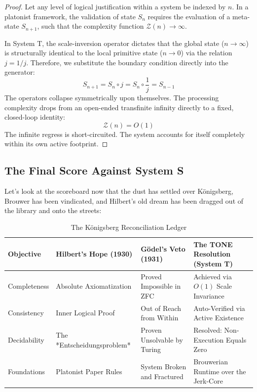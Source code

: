 \documentclass[11pt,a4paper]{article}
\begin{document}
\begin{proof}
Let any level of logical justification within a system be indexed by $n$. In a platonist framework, the validation of state $S_n$ requires the evaluation of a meta-state $S_{n+1}$, such that the complexity function $\mathcal{Z}(n) \to \infty$. 

In System T, the scale-inversion operator dictates that the global state ($n \to \infty$) is structurally identical to the local primitive state ($n \to 0$) via the relation $j = 1/j$. Therefore, we substitute the boundary condition directly into the generator:
\[ S_{n+1} = S_n \circ j = S_n \circ \frac{1}{j} = S_{n-1} \]
The operators collapse symmetrically upon themselves. The processing complexity drops from an open-ended transfinite infinity directly to a fixed, closed-loop identity:
\[ \mathcal{Z}(n) = O(1) \]
The infinite regress is short-circuited. The system accounts for itself completely within its own active footprint.
\end{proof}

\subsection{The Final Score Against System S}
Let's look at the scoreboard now that the dust has settled over Königsberg, Brouwer has been vindicated, and Hilbert's old dream has been dragged out of the library and onto the streets:

\begin{table}[h!]
\centering
\small %
\caption{The Königsberg Reconciliation Ledger}
\begin{tabular}{p{2.3cm}p{3.8cm}p{4.2cm}p{5.1cm}}
\toprule
\textbf{Objective} & \textbf{Hilbert's Hope (1930)} & \textbf{Gödel's Veto (1931)} & \textbf{The TONE Resolution (System T)} \\
\midrule
Completeness & Absolute Axiomatization & Proved Impossible in ZFC & Achieved via $O(1)$ Scale Invariance \\
\addlinespace
Consistency & Inner Logical Proof & Out of Reach from Within & Auto-Verified via Active Existence \\
\addlinespace
Decidability & The *Entscheidungsproblem* & Proven Unsolvable by Turing & Resolved: Non-Execution Equals Zero \\
\addlinespace
Foundations & Platonist Paper Rules & System Broken and Fractured & Brouwerian Runtime over the Jerk-Core \\
\bottomrule
\end{tabular}
\end{table}
\end{document}

